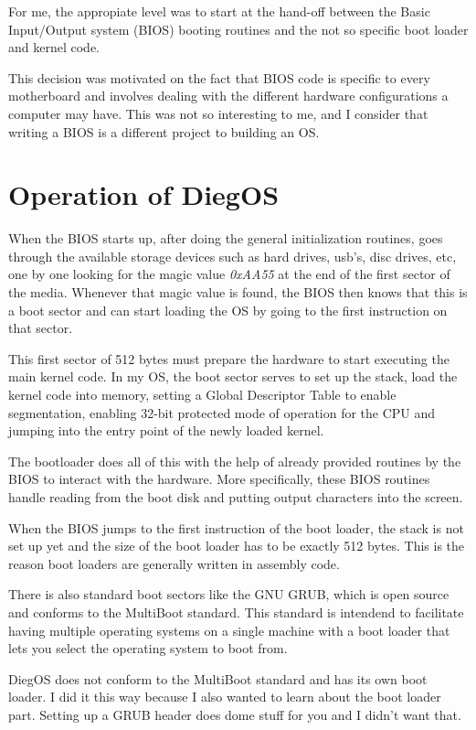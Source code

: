 \documentclass[12pt]{article}
\begin{document}
For me, the appropiate level was to start at the 
hand-off between the Basic Input/Output system (BIOS) booting routines and the not so specific
boot loader and kernel code.

This decision was motivated on the fact that BIOS code is specific to every motherboard and 
involves dealing with the different hardware configurations a computer may have. This was
not so interesting to me, and I consider that writing a BIOS is a different project to 
building an OS.


\section*{Operation of DiegOS}

When the BIOS starts up, after doing the general initialization routines, goes through the available
storage devices such as hard drives, usb's, disc drives, etc, one by one
looking for the magic value \textit{0xAA55} at the end of the first sector of the media. 
Whenever that magic value is found, the BIOS then knows that this is a boot sector 
and can start loading the OS by going to the first instruction on that sector.

This first sector of 512 bytes must prepare the hardware to start executing the main kernel code.
In my OS, the boot sector serves to set up the stack, load the kernel code into memory, setting a 
Global Descriptor Table to enable segmentation, enabling 32-bit protected mode of operation for 
the CPU and jumping into the entry point of the newly loaded kernel.

The bootloader does all of this with the help of already provided routines by the BIOS to interact
with the hardware. More specifically, these BIOS routines handle reading from the boot disk and 
putting output characters into the screen.

When the BIOS jumps to the first instruction of the boot loader, the stack is not set up yet
and the size of the boot loader has to be exactly 512 bytes. This is the reason boot loaders are
generally written in assembly code. 

There is also standard boot sectors like the GNU GRUB, which is open source and conforms to the 
MultiBoot standard. This standard is intendend to facilitate having multiple operating systems on a
single machine with a boot loader that lets you select the operating system to boot from.

DiegOS does not conform to the MultiBoot standard and has its own boot loader. I did it this way 
because I also wanted to learn about the boot loader part. Setting up a GRUB header does dome stuff
for you and I didn't want that.
\end{document}
